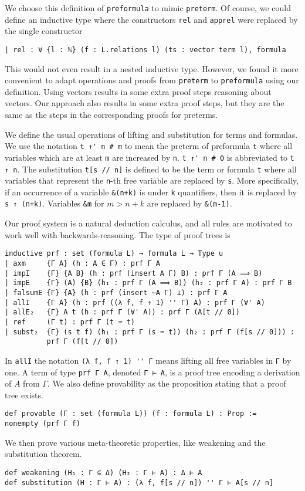 \documentclass[a4paper,USenglish,cleveref, autoref]{lipics-v2019}
\newcommand{\lil}{\lstinline}
\theoremstyle{theorem}
\theoremstyle{definition}
\begin{document}
We choose this definition of \lil{preformula} to mimic \lil{preterm}.
Of course, we could define an inductive type where the constructors \lil{rel} and \lil{apprel} were replaced by the single constructor
\begin{lstlisting}
| rel : ∀ {l : ℕ} (f : L.relations l) (ts : vector term l), formula
\end{lstlisting}
This would not even result in a nested inductive type.
However, we found it more convenient to adapt operations and proofs from \lil{preterm} to \lil{preformula} using our definition.
Using vectors results in some extra proof steps reasoning about vectors.
Our approach also results in some extra proof steps, but they are the same as the steps in the corresponding proofs for preterms.

We define the usual operations of lifting and substitution for terms and formulas.
We use the notation \lil{t ↑' n # m} to mean the preterm of preformula \lil{t} where all variables which are at least \lil{m} are increased by \lil{n}.
\lil{t ↑' n # 0} is abbreviated to \lil{t ↑ n}.
The substitution \lil{t[s // n]} is defined to be the term or formula \lil{t} where all variables that represent the \lil{n}-th free variable are replaced by \lil{s}.
More specifically, if an occurrence of a variable \lil{&(n+k)} is under \lil{k} quantifiers, then it is replaced by \lil{s ↑ (n+k)}.
Variables \lil{&m} for $m>n+k$ are replaced by \lil{&(m-1)}.

Our proof system is a natural deduction calculus, and %
all rules are motivated to work well with backwards-reasoning. The type of proof trees is
\begin{lstlisting}
inductive prf : set (formula L) → formula L → Type u
| axm     {Γ A} (h : A ∈ Γ) : prf Γ A
| impI    {Γ} {A B} (h : prf (insert A Γ) B) : prf Γ (A ⟹ B)
| impE    {Γ} (A) {B} (h₁ : prf Γ (A ⟹ B)) (h₂ : prf Γ A) : prf Γ B
| falsumE {Γ} {A} (h : prf (insert ∼A Γ) ⊥) : prf Γ A
| allI    {Γ A} (h : prf ((λ f, f ↑ 1) '' Γ) A) : prf Γ (∀' A)
| allE₂   {Γ} A t (h : prf Γ (∀' A)) : prf Γ (A[t // 0])
| ref     (Γ t) : prf Γ (t ≃ t)
| subst₂  {Γ} (s t f) (h₁ : prf Γ (s ≃ t)) (h₂ : prf Γ (f[s // 0])) :
          prf Γ (f[t // 0])
\end{lstlisting}
In \lil{allI} the notation \lil{(λ f, f ↑ 1) '' Γ} means lifting all free variables in \lil{Γ} by one.
A term of type \lil{prf Γ A}, denoted \lil{Γ ⊢ A}, is a proof tree encoding a derivation of $A$ from $\Gamma$.
We also define provability as the proposition stating that a proof tree exists.
\begin{lstlisting}
def provable (Γ : set (formula L)) (f : formula L) : Prop :=
nonempty (prf Γ f)
\end{lstlisting}
We then prove various meta-theoretic properties, like weakening and the substitution theorem.
\begin{lstlisting}
def weakening (H₁ : Γ ⊆ Δ) (H₂ : Γ ⊢ A) : Δ ⊢ A
def substitution (H : Γ ⊢ A) : (λ f, f[s // n]) '' Γ ⊢ A[s // n]
\end{lstlisting}
\end{document}
